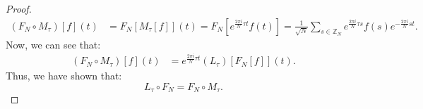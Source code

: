 \documentclass{article}
\def\zz{{\mathbb Z}}
\begin{document}
\begin{enumerate}[(a)]
\begin{proof}
\begin{align*}
            (F_N \circ M_\tau)[f](t) &= F_N[M_\tau[f]](t) = F_N[e^{\frac{2 \pi i}{N} \tau t} f(t)] = \frac{1}{\sqrt{N}} \sum_{s \in \zz_N} e^{\frac{2 \pi i}{N} \tau s} f(s) e^{-\frac{2 \pi i}{N} s t}.
        \end{align*}
        Now, we can see that:
        \begin{align*}
            (F_N \circ M_\tau)[f](t) &= e^{\frac{2 \pi i}{N} \tau t} (L_\tau)[F_N[f]](t).
        \end{align*}
        Thus, we have shown that:
        \begin{equation*}
            L_\tau \circ F_N = F_N \circ M_\tau.
        \end{equation*}
    \end{proof}
\end{enumerate}
\end{document}
